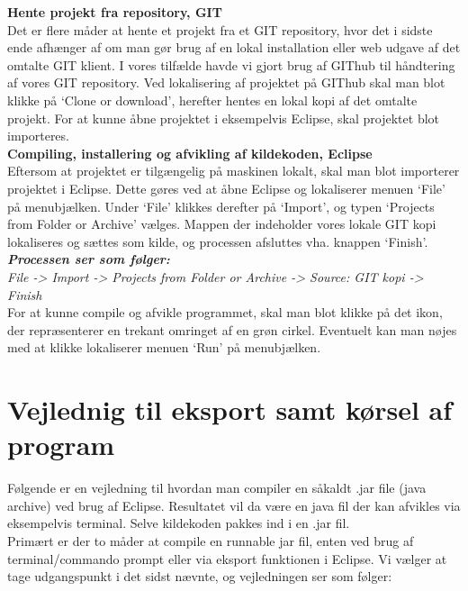 \noindent \textbf{Hente projekt fra repository, GIT}\\
Det er flere måder at hente et projekt fra et GIT repository, hvor det i sidste ende afhænger af om man gør brug af en lokal installation eller web udgave af det omtalte GIT klient. I vores tilfælde havde vi gjort brug af GIThub til håndtering af vores GIT repository. Ved lokalisering af projektet på GIThub skal man blot klikke på ‘Clone or download’, herefter hentes en lokal kopi af det omtalte projekt. For at kunne åbne projektet i eksempelvis Eclipse, skal projektet blot importeres.\\

\noindent \textbf{Compiling, installering og afvikling af kildekoden, Eclipse}\\
Eftersom at projektet er tilgængelig på maskinen lokalt, skal man blot importerer projektet i Eclipse. Dette gøres ved at åbne Eclipse og lokaliserer menuen ‘File’ på menubjælken. Under ‘File’ klikkes derefter på ‘Import’, og typen ‘Projects from Folder or Archive’ vælges. Mappen der indeholder vores lokale GIT kopi lokaliseres og sættes som kilde, og processen afsluttes vha. knappen ‘Finish’.\\

\noindent \textbf{\textit{Processen ser som følger:}}\\
\textit{File -> Import -> Projects from Folder or Archive -> Source: GIT kopi -> Finish}\\

\noindent For at kunne compile og afvikle programmet, skal man blot klikke på det ikon, der repræsenterer en trekant omringet af en grøn cirkel. Eventuelt kan man nøjes med at klikke lokaliserer menuen ‘Run’ på menubjælken.
\newpage
\section{Vejlednig til eksport samt kørsel af program}
Følgende er en vejledning til hvordan man compiler en såkaldt .jar file (java archive) ved brug af Eclipse. Resultatet vil da være en java fil der kan afvikles via eksempelvis terminal. Selve kildekoden pakkes ind i en .jar fil.\\

\noindent Primært er der to måder at compile en runnable jar fil, enten ved brug af terminal/commando prompt eller via eksport funktionen i Eclipse. Vi vælger at tage udgangspunkt i det sidst nævnte, og vejledningen ser som følger:\\

